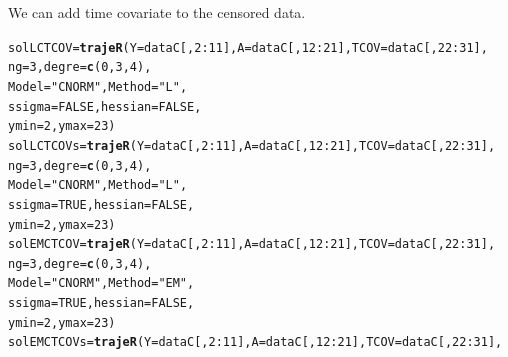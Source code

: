 \documentclass{article}\usepackage[]{graphicx}\usepackage[]{color}
\makeatletter
\newcommand{\hlnum}[1]{\textcolor[rgb]{0.686,0.059,0.569}{#1}}%
\newcommand{\hlstr}[1]{\textcolor[rgb]{0.192,0.494,0.8}{#1}}%
\newcommand{\hlopt}[1]{\textcolor[rgb]{0,0,0}{#1}}%
\newcommand{\hlstd}[1]{\textcolor[rgb]{0.345,0.345,0.345}{#1}}%
\newcommand{\hlkwb}[1]{\textcolor[rgb]{0.69,0.353,0.396}{#1}}%
\newcommand{\hlkwc}[1]{\textcolor[rgb]{0.333,0.667,0.333}{#1}}%
\newcommand{\hlkwd}[1]{\textcolor[rgb]{0.737,0.353,0.396}{\textbf{#1}}}%
\newenvironment{kframe}{%
 \def\at@end@of@kframe{}%
 \ifinner\ifhmode%
  \def\at@end@of@kframe{\end{minipage}}%
  \begin{minipage}{\columnwidth}%
 \fi\fi%
 \def\FrameCommand##1{\hskip\@totalleftmargin \hskip-\fboxsep
 \colorbox{shadecolor}{##1}\hskip-\fboxsep
     \hskip-\linewidth \hskip-\@totalleftmargin \hskip\columnwidth}%
 \MakeFramed {\advance\hsize-\width
   \@totalleftmargin\z@ \linewidth\hsize
   \@setminipage}}%
 {\par\unskip\endMakeFramed%
 \at@end@of@kframe}
\newenvironment{knitrout}{}{} %
\makeatother
\begin{document}
We can add time covariate to the censored data.
\begin{knitrout}
\color{fgcolor}\begin{kframe}
\begin{alltt}
\hlstd{solLCTCOV} \hlkwb{=} \hlkwd{trajeR}\hlstd{(}\hlkwc{Y} \hlstd{= dataC[,}\hlnum{2}\hlopt{:}\hlnum{11}\hlstd{],} \hlkwc{A} \hlstd{= dataC[,}\hlnum{12}\hlopt{:}\hlnum{21}\hlstd{],} \hlkwc{TCOV} \hlstd{= dataC[,}\hlnum{22}\hlopt{:}\hlnum{31}\hlstd{],}
                   \hlkwc{ng} \hlstd{=} \hlnum{3}\hlstd{,} \hlkwc{degre} \hlstd{=} \hlkwd{c}\hlstd{(}\hlnum{0}\hlstd{,}\hlnum{3}\hlstd{,}\hlnum{4}\hlstd{),}
                   \hlkwc{Model} \hlstd{=} \hlstr{"CNORM"}\hlstd{,} \hlkwc{Method} \hlstd{=} \hlstr{"L"}\hlstd{,}
                   \hlkwc{ssigma} \hlstd{=} \hlnum{FALSE}\hlstd{,} \hlkwc{hessian} \hlstd{=} \hlnum{FALSE}\hlstd{,}
                   \hlkwc{ymin} \hlstd{=} \hlnum{2}\hlstd{,}  \hlkwc{ymax} \hlstd{=} \hlnum{23}\hlstd{)}
\hlstd{solLCTCOVs} \hlkwb{=} \hlkwd{trajeR}\hlstd{(}\hlkwc{Y} \hlstd{= dataC[,}\hlnum{2}\hlopt{:}\hlnum{11}\hlstd{],} \hlkwc{A} \hlstd{= dataC[,}\hlnum{12}\hlopt{:}\hlnum{21}\hlstd{],} \hlkwc{TCOV} \hlstd{= dataC[,}\hlnum{22}\hlopt{:}\hlnum{31}\hlstd{],}
                    \hlkwc{ng} \hlstd{=} \hlnum{3}\hlstd{,} \hlkwc{degre} \hlstd{=} \hlkwd{c}\hlstd{(}\hlnum{0}\hlstd{,}\hlnum{3}\hlstd{,}\hlnum{4}\hlstd{),}
                    \hlkwc{Model} \hlstd{=} \hlstr{"CNORM"}\hlstd{,} \hlkwc{Method} \hlstd{=} \hlstr{"L"}\hlstd{,}
                    \hlkwc{ssigma} \hlstd{=} \hlnum{TRUE}\hlstd{,} \hlkwc{hessian} \hlstd{=} \hlnum{FALSE}\hlstd{,}
                    \hlkwc{ymin} \hlstd{=} \hlnum{2}\hlstd{,}  \hlkwc{ymax} \hlstd{=} \hlnum{23}\hlstd{)}
\hlstd{solEMCTCOV} \hlkwb{=} \hlkwd{trajeR}\hlstd{(}\hlkwc{Y} \hlstd{= dataC[,}\hlnum{2}\hlopt{:}\hlnum{11}\hlstd{],} \hlkwc{A} \hlstd{= dataC[,}\hlnum{12}\hlopt{:}\hlnum{21}\hlstd{],} \hlkwc{TCOV} \hlstd{= dataC[,}\hlnum{22}\hlopt{:}\hlnum{31}\hlstd{],}
                    \hlkwc{ng} \hlstd{=} \hlnum{3}\hlstd{,} \hlkwc{degre} \hlstd{=} \hlkwd{c}\hlstd{(}\hlnum{0}\hlstd{,}\hlnum{3}\hlstd{,}\hlnum{4}\hlstd{),}
                    \hlkwc{Model} \hlstd{=} \hlstr{"CNORM"}\hlstd{,} \hlkwc{Method} \hlstd{=} \hlstr{"EM"}\hlstd{,}
                    \hlkwc{ssigma} \hlstd{=} \hlnum{TRUE}\hlstd{,} \hlkwc{hessian} \hlstd{=} \hlnum{FALSE}\hlstd{,}
                    \hlkwc{ymin} \hlstd{=} \hlnum{2}\hlstd{,}  \hlkwc{ymax} \hlstd{=} \hlnum{23}\hlstd{)}
\hlstd{solEMCTCOVs} \hlkwb{=} \hlkwd{trajeR}\hlstd{(}\hlkwc{Y} \hlstd{= dataC[,}\hlnum{2}\hlopt{:}\hlnum{11}\hlstd{],} \hlkwc{A} \hlstd{= dataC[,}\hlnum{12}\hlopt{:}\hlnum{21}\hlstd{],} \hlkwc{TCOV} \hlstd{= dataC[,}\hlnum{22}\hlopt{:}\hlnum{31}\hlstd{],}

\end{alltt}
\end{kframe}
\end{knitrout}
\end{document}
